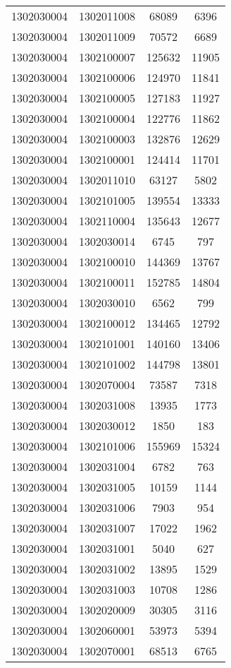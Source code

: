 \begin{longtable}{llcc}
1302030004 & 1302011008 & 68089 & 6396\\
1302030004 & 1302011009 & 70572 & 6689\\
1302030004 & 1302100007 & 125632 & 11905\\
1302030004 & 1302100006 & 124970 & 11841\\
1302030004 & 1302100005 & 127183 & 11927\\
1302030004 & 1302100004 & 122776 & 11862\\
1302030004 & 1302100003 & 132876 & 12629\\
1302030004 & 1302100001 & 124414 & 11701\\
1302030004 & 1302011010 & 63127 & 5802\\
1302030004 & 1302101005 & 139554 & 13333\\
1302030004 & 1302110004 & 135643 & 12677\\
1302030004 & 1302030014 & 6745 & 797\\
1302030004 & 1302100010 & 144369 & 13767\\
1302030004 & 1302100011 & 152785 & 14804\\
1302030004 & 1302030010 & 6562 & 799\\
1302030004 & 1302100012 & 134465 & 12792\\
1302030004 & 1302101001 & 140160 & 13406\\
1302030004 & 1302101002 & 144798 & 13801\\
1302030004 & 1302070004 & 73587 & 7318\\
1302030004 & 1302031008 & 13935 & 1773\\
1302030004 & 1302030012 & 1850 & 183\\
1302030004 & 1302101006 & 155969 & 15324\\
1302030004 & 1302031004 & 6782 & 763\\
1302030004 & 1302031005 & 10159 & 1144\\
1302030004 & 1302031006 & 7903 & 954\\
1302030004 & 1302031007 & 17022 & 1962\\
1302030004 & 1302031001 & 5040 & 627\\
1302030004 & 1302031002 & 13895 & 1529\\
1302030004 & 1302031003 & 10708 & 1286\\
1302030004 & 1302020009 & 30305 & 3116\\
1302030004 & 1302060001 & 53973 & 5394\\
1302030004 & 1302070001 & 68513 & 6765\\

\end{longtable}
